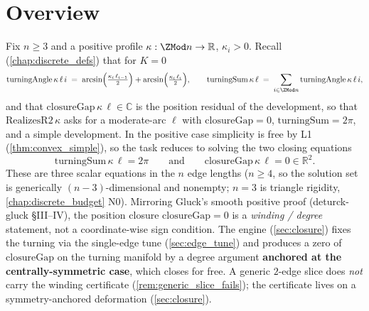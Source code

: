 \section{Overview}

Fix $n \ge 3$ and a positive profile $\kappa : \ZMod n \to \mathbb{R}$,
$\kappa_i > 0$. Recall (\cref{chap:discrete_defs}) that for $K = 0$
\[
  \mathrm{turningAngle}\,\kappa\,\ell\,i
    \;=\; \arcsin\!\Big(\tfrac{\kappa_i\,\ell_{i-1}}{2}\Big)
        + \arcsin\!\Big(\tfrac{\kappa_i\,\ell_i}{2}\Big),
  \qquad
  \mathrm{turningSum}\,\kappa\,\ell \;=\; \sum_{i \in \ZMod n}
    \mathrm{turningAngle}\,\kappa\,\ell\,i,
\]
and that $\mathrm{closureGap}\,\kappa\,\ell \in \mathbb{C}$ is the position
residual of the development, so that $\mathrm{RealizesR2}\,\kappa$ asks for a
moderate-arc $\ell$ with $\mathrm{closureGap} = 0$,
$\mathrm{turningSum} = 2\pi$, and a simple development. In the positive case
simplicity is free by L1 (\cref{thm:convex_simple}), so the task reduces to
solving the two closing equations
\[
  \mathrm{turningSum}\,\kappa\,\ell = 2\pi
  \qquad\text{and}\qquad
  \mathrm{closureGap}\,\kappa\,\ell = 0 \in \mathbb{R}^2 .
\]
These are three scalar equations in the $n$ edge lengths ($n \ge 4$, so the
solution set is generically $(n-3)$-dimensional and nonempty; $n = 3$ is triangle
rigidity, \cref{chap:discrete_budget} N0). Mirroring Gluck's smooth positive
proof (deturck-gluck §III--IV), the position closure $\mathrm{closureGap} = 0$ is
a \emph{winding / degree} statement, not a coordinate-wise sign condition. The
engine (\cref{sec:closure}) fixes the turning via the single-edge tune
(\cref{sec:edge_tune}) and produces a zero of $\mathrm{closureGap}$ on the turning
manifold by a degree argument \textbf{anchored at the centrally-symmetric case},
which closes for free. A generic $2$-edge slice does \emph{not} carry the winding
certificate (\cref{rem:generic_slice_fails}); the certificate lives on a
symmetry-anchored deformation (\cref{sec:closure}).

